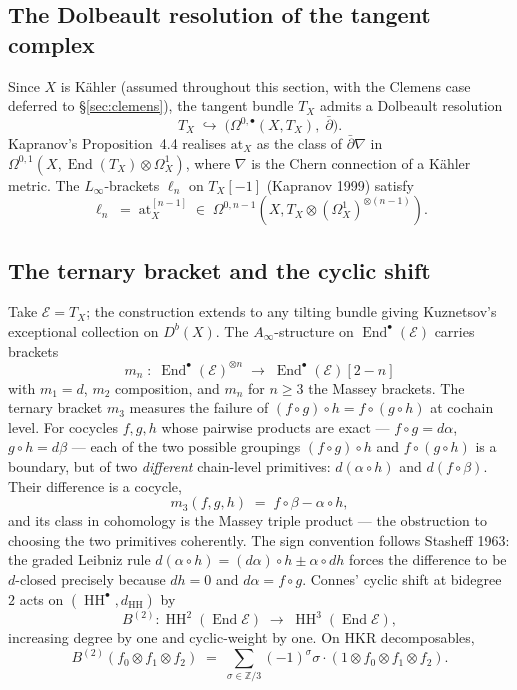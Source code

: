 \documentclass[11pt,reqno]{amsart}
\theoremstyle{plain}
\theoremstyle{definition}
\theoremstyle{remark}
\DeclareMathOperator{\End}{End}
\DeclareMathOperator{\HH}{HH}
\newcommand{\Zbb}{\mathbb{Z}}
\newcommand{\cE}{\mathcal{E}}
\newcommand{\at}{\mathrm{at}}
\begin{document}
\subsection{The Dolbeault resolution of the tangent complex}
Since $X$ is Kähler (assumed throughout this section, with the Clemens case deferred to §\ref{sec:clemens}), the tangent bundle $T_X$ admits a Dolbeault resolution
\[
  T_X \;\hookrightarrow\; \bigl(\Omega^{0,\bullet}(X, T_X),\; \bar\partial\bigr).
\]
Kapranov's Proposition~4.4 realises $\at_X$ as the class of $\bar\partial \nabla$ in $\Omega^{0,1}(X, \End(T_X) \otimes \Omega^1_X)$, where $\nabla$ is the Chern connection of a Kähler metric. The $L_\infty$-brackets $\ell_n$ on $T_X[-1]$ (Kapranov 1999) satisfy
\[
  \ell_n \;=\; \at_X^{[n-1]} \;\in\; \Omega^{0, n-1}(X, T_X \otimes (\Omega^1_X)^{\otimes (n-1)}).
\]

\subsection{The ternary bracket and the cyclic shift}
Take $\cE = T_X$; the construction extends to any tilting bundle giving Kuznetsov's exceptional collection on $D^b(X)$. The $A_\infty$-structure on $\End^\bullet(\cE)$ carries brackets
\[
  m_n \;:\; \End^\bullet(\cE)^{\otimes n} \;\longrightarrow\; \End^\bullet(\cE)[2-n]
\]
with $m_1 = d$, $m_2$ composition, and $m_n$ for $n \geq 3$ the Massey brackets. The ternary bracket $m_3$ measures the failure of $(f \circ g) \circ h = f \circ (g \circ h)$ at cochain level. For cocycles $f, g, h$ whose pairwise products are exact --- $f \circ g = d\alpha$, $g \circ h = d\beta$ ---  each of the two possible groupings $(f \circ g) \circ h$ and $f \circ (g \circ h)$ is a boundary, but of two \emph{different} chain-level primitives: $d(\alpha \circ h)$ and $d(f \circ \beta)$. Their difference is a cocycle,
\[
  m_3(f,g,h) \;=\; f \circ \beta - \alpha \circ h,
\]
and its class in cohomology is the Massey triple product --- the obstruction to choosing the two primitives coherently. The sign convention follows Stasheff 1963: the graded Leibniz rule $d(\alpha \circ h) = (d\alpha) \circ h \pm \alpha \circ dh$ forces the difference to be $d$-closed precisely because $dh = 0$ and $d\alpha = f \circ g$.
Connes' cyclic shift at bidegree $2$ acts on $(\HH^\bullet, d_{\HH})$ by
\[
  B^{(2)} : \HH^2(\End \cE) \;\longrightarrow\; \HH^3(\End \cE),
\]
increasing degree by one and cyclic-weight by one. On HKR decomposables,
\[
  B^{(2)}(f_0 \otimes f_1 \otimes f_2) \;=\; \sum_{\sigma \in \Zbb/3} (-1)^\sigma \sigma \cdot (1 \otimes f_0 \otimes f_1 \otimes f_2).
\]
\end{document}
